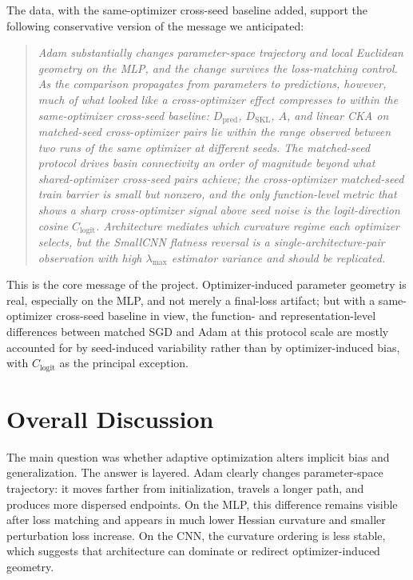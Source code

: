 \documentclass[11pt]{article}
\begin{document}
The data, with the same-optimizer cross-seed baseline added, support the following conservative version of the message we anticipated:
\begin{quote}
\emph{Adam substantially changes parameter-space trajectory and local Euclidean geometry on the MLP, and the change survives the loss-matching control. As the comparison propagates from parameters to predictions, however, much of what looked like a cross-optimizer effect compresses to within the same-optimizer cross-seed baseline: $D_{\mathrm{pred}}$, $D_{\mathrm{SKL}}$, $A$, and linear CKA on matched-seed cross-optimizer pairs lie within the range observed between two runs of the same optimizer at different seeds. The matched-seed protocol drives basin connectivity an order of magnitude beyond what shared-optimizer cross-seed pairs achieve; the cross-optimizer matched-seed train barrier is small but nonzero, and the only function-level metric that shows a sharp cross-optimizer signal above seed noise is the logit-direction cosine $C_{\mathrm{logit}}$. Architecture mediates which curvature regime each optimizer selects, but the SmallCNN flatness reversal is a single-architecture-pair observation with high $\lambda_{\max}$ estimator variance and should be replicated.}
\end{quote}

This is the core message of the project. Optimizer-induced parameter geometry is real, especially on the MLP, and not merely a final-loss artifact; but with a same-optimizer cross-seed baseline in view, the function- and representation-level differences between matched SGD and Adam at this protocol scale are mostly accounted for by seed-induced variability rather than by optimizer-induced bias, with $C_{\mathrm{logit}}$ as the principal exception.

\FloatBarrier


\section{Overall Discussion}

The main question was whether adaptive optimization alters implicit bias and generalization. The answer is layered. Adam clearly changes parameter-space trajectory: it moves farther from initialization, travels a longer path, and produces more dispersed endpoints. On the MLP, this difference remains visible after loss matching and appears in much lower Hessian curvature and smaller perturbation loss increase. On the CNN, the curvature ordering is less stable, which suggests that architecture can dominate or redirect optimizer-induced geometry.
\end{document}
